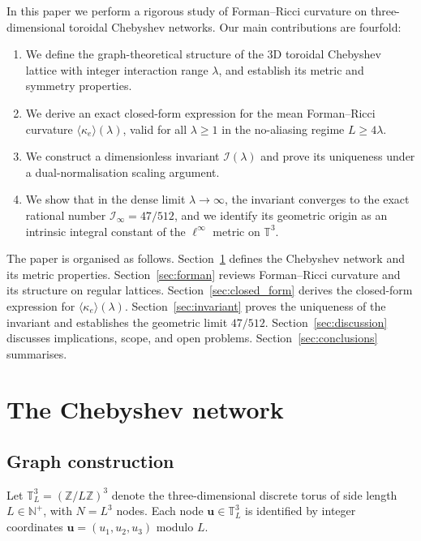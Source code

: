 \documentclass[aps,pre,onecolumn,10pt,groupedaddress,amsmath,amssymb,floatfix]{revtex4-2}
\begin{document}
In this paper we perform a rigorous study of Forman--Ricci curvature on three-dimensional toroidal Chebyshev networks. Our main contributions are fourfold:
\begin{enumerate}
\item We define the graph-theoretical structure of the 3D toroidal Chebyshev lattice with integer interaction range $\lambda$, and establish its metric and symmetry properties.
\item We derive an exact closed-form expression for the mean Forman--Ricci curvature $\langle\kappa_e\rangle(\lambda)$, valid for all $\lambda \ge 1$ in the no-aliasing regime $L \ge 4\lambda$.
\item We construct a dimensionless invariant $\mathcal{I}(\lambda)$ and prove its uniqueness under a dual-normalisation scaling argument.
\item We show that in the dense limit $\lambda \to \infty$, the invariant converges to the exact rational number $\mathcal{I}_\infty = 47/512$, and we identify its geometric origin as an intrinsic integral constant of the $\ell^\infty$ metric on $\mathbb{T}^3$.
\end{enumerate}

The paper is organised as follows. Section~\ref{sec:network} defines the Chebyshev network and its metric properties. Section~\ref{sec:forman} reviews Forman--Ricci curvature and its structure on regular lattices. Section~\ref{sec:closed_form} derives the closed-form expression for $\langle\kappa_e\rangle(\lambda)$. Section~\ref{sec:invariant} proves the uniqueness of the invariant and establishes the geometric limit $47/512$. Section~\ref{sec:discussion} discusses implications, scope, and open problems. Section~\ref{sec:conclusions} summarises.

\section{The Chebyshev network}
\label{sec:network}

\subsection{Graph construction}

Let $\mathbb{T}^3_L = (\mathbb{Z}/L\mathbb{Z})^3$ denote the three-dimensional discrete torus of side length $L \in \mathbb{N}^+$, with $N = L^3$ nodes. Each node $\mathbf{u} \in \mathbb{T}^3_L$ is identified by integer coordinates $\mathbf{u} = (u_1, u_2, u_3)$ modulo $L$.
\end{document}
